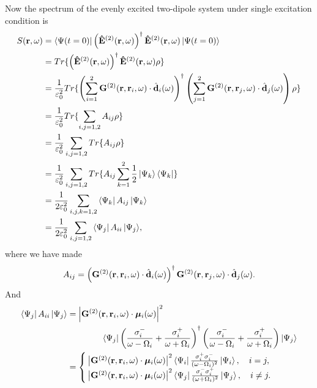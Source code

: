 Now the spectrum of the evenly excited two-dipole system under single excitation condition is
\begin{align}
S({\bf r},\omega)&= \mathinner{\langle{\Psi(t=0)}|}\left(\mathbf{\hat{E}}^{(2)}({\bf
r},\omega)\right)^\dagger \mathbf{\hat{E}}^{(2)}({\bf
r},\omega)\mathinner{|{\Psi(t=0)}\rangle}  \nonumber\\
&= Tr\lbrace \left(\mathbf{\hat{E}}^{(2)}({\bf r},\omega)\right)^\dagger \mathbf{\hat{E}}^{(2)}({\bf
r},\omega)\rho \rbrace \\
&= \frac{1}{\varepsilon_0^2} Tr \lbrace \left( \sum_{i=1}^2 {\mathbf{G}^{(2)}(\mathbf{r},\mathbf{r}_i,\omega)\cdot \hat{\mathbf{d}}_i(\omega)} \right)^\dagger \left( \sum_{j=1}^2 {\mathbf{G}^{(2)}(\mathbf{r},\mathbf{r}_j,\omega)\cdot \hat{\mathbf{d}}_j(\omega)} \right) \rho \rbrace \\
&= \frac{1}{\varepsilon_0^2} Tr \lbrace \sum_{i,j=1,2}{A_{ij}}\rho \rbrace \\
&= \frac{1}{\varepsilon_0^2} \sum_{i,j=1,2}{ Tr \lbrace A_{ij} \rho \rbrace}\\
&= \frac{1}{\varepsilon_0^2} \sum_{i,j=1,2}{Tr \lbrace A_{ij} \sum_{k=1}^2{\frac{1}{2}\mathinner{|{\Psi_k}\rangle}\mathinner{\langle{\Psi_k}|}}\rbrace}\\
&= \frac{1}{2\varepsilon_0^2} \sum_{i,j,k=1,2}{\mathinner{\langle{\Psi_k}|}A_{ij}\mathinner{|{\Psi_k}\rangle}} \\
&= \frac{1}{2\varepsilon_0^2} \sum_{i,j=1,2}{\mathinner{\langle{\Psi_j}|}A_{ii}\mathinner{|{\Psi_j}\rangle}},
\end{align}
where we have made
\begin{equation}
A_{ij}=\left( \mathbf{G}^{(2)}(\mathbf{r},\mathbf{r}_i,\omega)\cdot \hat{\mathbf{d}}_i(\omega) \right)^\dagger \mathbf{G}^{(2)}(\mathbf{r},\mathbf{r}_j,\omega)\cdot \hat{\mathbf{d}}_j(\omega).
\end{equation}
And
\begin{align}
{\mathinner{\langle{\Psi_j}|}A_{ii}\mathinner{|{\Psi_j}\rangle}} &= \left| \mathbf{G}^{(2)}(\mathbf{r},\mathbf{r}_i,\omega)\cdot {\bm \mu}_i(\omega) \right|^2 \nonumber \\
&\quad \quad \quad \quad \mathinner{\langle{\Psi_j}|} \left( \frac{\sigma^{-}_i}{\omega-\Omega_i}+\frac{\sigma^{+}_i}{\omega+\Omega_i} \right)^\dagger \left( \frac{\sigma^{-}_i}{\omega-\Omega_i}+\frac{\sigma^{+}_i}{\omega+\Omega_i} \right)\mathinner{|{\Psi_j}\rangle} \\
&=  \begin{cases} \left| \mathbf{G}^{(2)}(\mathbf{r},\mathbf{r}_i,\omega)\cdot {\bm \mu}_i(\omega) \right|^2 \mathinner{\langle{\Psi_i}|}  \frac{\sigma^{+}_i\sigma^{-}_i}{(\omega-\Omega_i)^2}\mathinner{|{\Psi_i}\rangle}, \quad i=j, \\
\left| \mathbf{G}^{(2)}(\mathbf{r},\mathbf{r}_i,\omega)\cdot {\bm \mu}_i(\omega) \right|^2 \mathinner{\langle{\Psi_j}|}  \frac{\sigma^{-}_i\sigma^{+}_i}{(\omega+\Omega_i)^2}\mathinner{|{\Psi_j}\rangle}, \quad i\neq j.
\end{cases}
\end{align}
